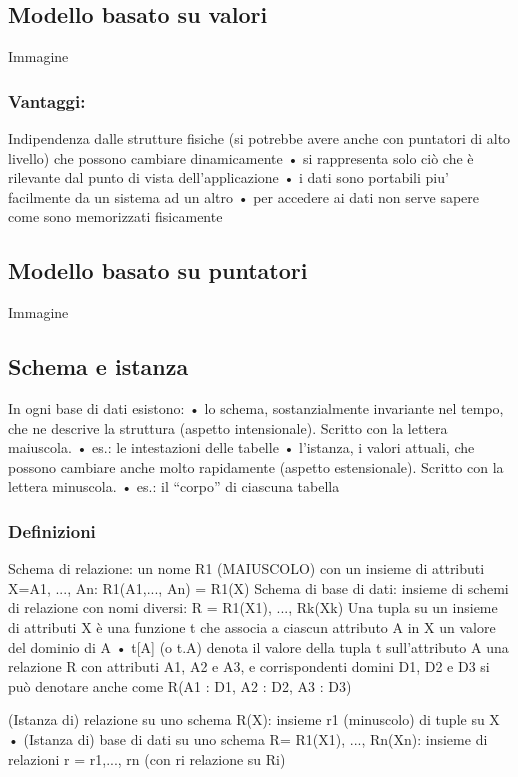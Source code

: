 \subsection{Modello basato su valori}
Immagine
\subsubsection{Vantaggi:}
Indipendenza dalle strutture fisiche (si potrebbe avere anche 
con puntatori di alto livello) che possono cambiare
dinamicamente
• si rappresenta solo ciò che è rilevante dal punto di vista
dell'applicazione
• i dati sono portabili piu' facilmente da un sistema ad un altro
• per accedere ai dati non serve sapere come sono memorizzati
fisicamente
\subsection{Modello basato su puntatori}
Immagine

\subsection{Schema e istanza}
In ogni base di dati esistono:
• lo schema, sostanzialmente invariante nel tempo, che ne
descrive la struttura (aspetto intensionale). Scritto con la lettera maiuscola.
• es.: le intestazioni delle tabelle
• l'istanza, i valori attuali, che possono cambiare anche
molto rapidamente (aspetto estensionale). Scritto con la lettera minuscola.
• es.: il “corpo” di ciascuna tabella

\subsubsection{Definizioni}
Schema di relazione:
un nome R1 (MAIUSCOLO) con un insieme di attributi
X={A1, ..., An}:
R1(A1,..., An) = R1(X)
Schema di base di dati:
insieme di schemi di relazione con nomi diversi:
R = {R1(X1), ..., Rk(Xk)}
Una tupla su un insieme di attributi X è una funzione t che associa a
ciascun attributo A in X un valore del dominio di A
• t[A] (o t.A) denota il valore della tupla t sull'attributo A
una relazione R con attributi A1, A2 e A3, e corrispondenti
domini D1, D2 e D3 si può denotare anche come
R(A1 : D1, A2 : D2, A3 : D3)

(Istanza di) relazione su uno schema R(X):
insieme r1 (minuscolo) di tuple su X
• (Istanza di) base di dati su uno schema R= {R1(X1), ..., Rn(Xn)}:
insieme di relazioni r = {r1,..., rn} (con ri relazione su Ri)

